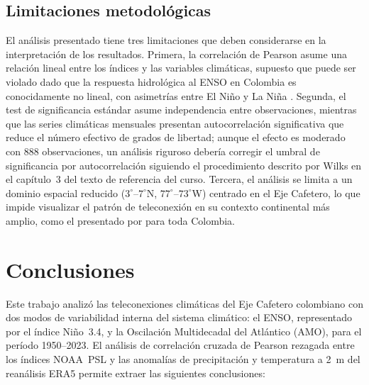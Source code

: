 \documentclass[12pt, a4paper]{article}
\begin{document}
\subsection{Limitaciones metodológicas}

El análisis presentado tiene tres limitaciones que deben considerarse en la
interpretación de los resultados. Primera, la correlación de Pearson asume
una relación lineal entre los índices y las variables climáticas, supuesto
que puede ser violado dado que la respuesta hidrológica al ENSO en Colombia
es conocidamente no lineal, con asimetrías entre El Niño y La Niña
\citep{Poveda2011, CórdobaMachado2015a}. Segunda, el test de significancia estándar asume
independencia entre observaciones, mientras que las series climáticas mensuales
presentan autocorrelación significativa que reduce el número efectivo de grados
de libertad; aunque el efecto es moderado con 888 observaciones, un análisis
riguroso
debería corregir el umbral de significancia por autocorrelación
siguiendo el procedimiento descrito por Wilks \citet{Wilks2011} en el capítulo~3
del texto de referencia del curso. Tercera, el
análisis se limita a un dominio espacial reducido ($3^\circ$--$7^\circ$N,
$77^\circ$--$73^\circ$W) centrado en el Eje Cafetero, lo que impide visualizar
el patrón de teleconexión en su contexto continental más amplio, como el
presentado por \citet{CórdobaMachado2015b} para toda Colombia.

\section{Conclusiones}

Este trabajo analizó las teleconexiones climáticas del Eje Cafetero colombiano
con dos modos de variabilidad interna del sistema climático: el ENSO, representado
por el índice Niño~3.4, y la Oscilación Multidecadal del Atlántico (AMO), para
el período 1950--2023. El análisis de correlación cruzada de Pearson rezagada
entre los índices NOAA~PSL y las anomalías de precipitación y temperatura a 2~m
del reanálisis ERA5 permite extraer las siguientes conclusiones:
\end{document}
